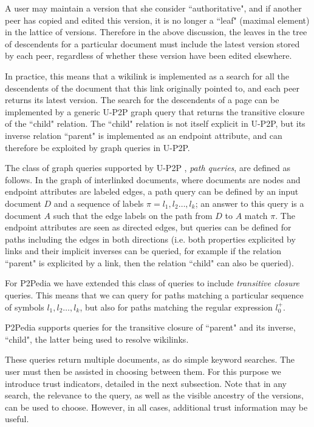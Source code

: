A user may maintain a version that she consider ``authoritative", and if another peer has copied and edited this version, it is no longer a ``leaf" (maximal element) in the lattice of versions. Therefore in the above discussion, the leaves in the tree of descendents for a particular document must include the latest version stored by each peer, regardless of whether these version have been edited elsewhere.

In practice, this means that a wikilink is implemented as a search for all the descendents of the document that this link originally pointed to, and each peer returns its latest version. The search for the descendents of a page can be implemented by a generic U-P2P graph query that returns the transitive closure of the ``child" relation. The ``child" relation is not itself explicit in U-P2P, but its inverse relation ``parent" is implemented as an endpoint attribute, and can therefore be exploited by graph queries in U-P2P.

The class of graph queries supported by U-P2P \cite{UP2P:201101TechReport}, \emph{path queries}, are defined as follows. In the graph of interlinked documents, where documents are nodes and endpoint attributes are labeled edges, a path query can be defined by an input document $D$ and a sequence of labels $\pi = l_1,l_2 \dots, l_k$; an answer to this query is a document $A$ such that the edge labels on the path from $D$ to $A$ match $\pi$. The endpoint attributes are seen as directed edges, but queries can be defined for paths including the edges in both directions (i.e. both properties explicited by links and their implicit inverses can be queried, for example if the relation ``parent" is explicited by a link, then the relation ``child" can also be queried).

For P2Pedia we have extended this class of queries to include \emph{transitive closure} queries. This means that we can query for paths matching a particular sequence of symbols $l_1,l_2 \dots, l_k$, but also for paths matching the regular expression $l_0^{+}$.

P2Pedia supports queries for the transitive closure of ``parent" and its inverse, ``child", the latter being used to resolve wikilinks.

These queries return multiple documents, as do simple keyword searches. The user must then be assisted in choosing between them. For this purpose we introduce trust indicators, detailed in the next subsection. Note that in any search, the relevance to the query, as well as the visible ancestry of the versions, can be used to choose. However, in all cases, additional trust information may be useful. 

